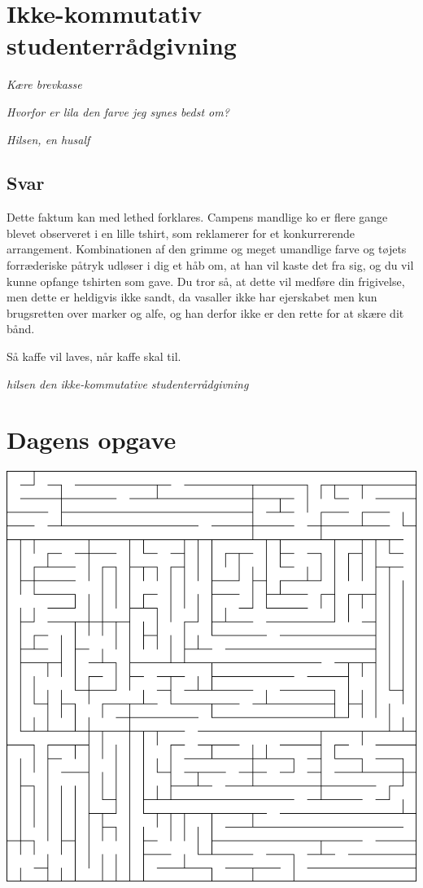 \begin{minipage}[t]{170mm}
\vspace{3mm}
\section*{Ikke-kommutativ studenterrådgivning}
\emph{Kære brevkasse}

\emph{Hvorfor er  lila den farve jeg synes bedst om?}

\emph{Hilsen, en husalf}

\subsection*{Svar}
Dette faktum kan med lethed forklares. Campens mandlige ko er flere gange blevet observeret i en lille tshirt, som reklamerer for et konkurrerende arrangement. Kombinationen af den grimme og meget umandlige farve og tøjets forræderiske påtryk udløser i dig et håb om, at han vil kaste det fra sig, og du vil kunne opfange tshirten som gave. Du tror så, at dette vil medføre din frigivelse, men dette er heldigvis ikke sandt, da vasaller ikke har ejerskabet men kun brugsretten over marker og alfe, og han derfor ikke er den rette for at skære dit bånd.

Så kaffe vil laves, når kaffe skal til.

{\flushright\emph{hilsen den ikke-kommutative studenterrådgivning}}
\vspace{3mm}
\section*{Dagens opgave}

\includegraphics[width=\textwidth]{maze.png}


\end{minipage}
